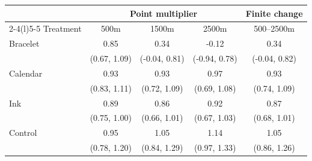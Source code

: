 \begin{tabular}{lcccc}
\toprule
& \multicolumn{3}{c}{Point multiplier} & Finite change \\
\cmidrule(lr){2-4}\cmidrule(l){5-5}
Treatment & 500m & 1500m & 2500m & 500--2500m \\
\midrule
Bracelet & 0.85 & 0.34 & -0.12 & 0.34 \\
 & (0.67, 1.09) & (-0.04, 0.81) & (-0.94, 0.78) & (-0.04, 0.82) \\
Calendar & 0.93 & 0.93 & 0.97 & 0.93 \\
 & (0.83, 1.11) & (0.72, 1.09) & (0.69, 1.08) & (0.74, 1.09) \\
Ink & 0.89 & 0.86 & 0.92 & 0.87 \\
 & (0.75, 1.00) & (0.66, 1.01) & (0.67, 1.03) & (0.68, 1.01) \\
Control & 0.95 & 1.05 & 1.14 & 1.05 \\
 & (0.78, 1.20) & (0.84, 1.29) & (0.97, 1.33) & (0.86, 1.26) \\
\bottomrule
\end{tabular}

